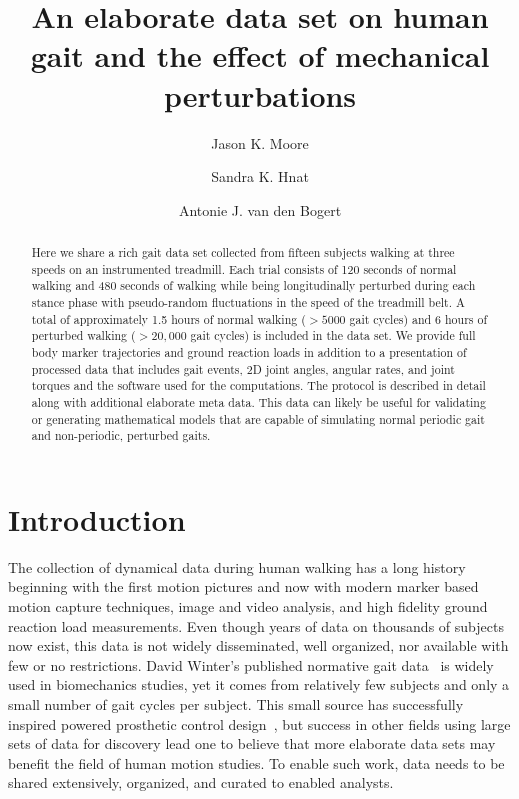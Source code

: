 \documentclass[10pt,a4paper,twocolumn]{article}
\begin{document}
\title{An elaborate data set on human gait and the effect of mechanical
  perturbations}

\author[1]{Jason K. Moore}
\author[1]{Sandra K. Hnat}
\author[1]{Antonie J. van den Bogert}


\maketitle
\thispagestyle{fancy}

\begin{abstract}

  Here we share a rich gait data set collected from fifteen subjects walking at
  three speeds on an instrumented treadmill. Each trial consists of 120 seconds
  of normal walking and 480 seconds of walking while being longitudinally
  perturbed during each stance phase with pseudo-random
  fluctuations in the speed of the treadmill belt. A total of approximately 1.5
  hours of normal walking ($>5000$ gait cycles) and 6 hours of perturbed walking
  ($>20,000$ gait cycles) is included in the data set. We provide full body
  marker trajectories and ground reaction loads in addition to a presentation of
  processed data that includes gait events, 2D joint angles, angular rates,
  and joint torques and the software used for the computations. The protocol is
  described in detail along with additional elaborate meta data. This data can
  likely be useful for validating or generating mathematical models that are
  capable of simulating normal periodic gait and non-periodic, perturbed gaits.

\end{abstract}
\clearpage

\section*{Introduction}
%
The collection of dynamical data during human walking has a long history
beginning with the first motion pictures and now with modern marker based
motion capture techniques, image and video analysis, and high fidelity ground
reaction load measurements. Even though years of data on thousands of subjects
now exist, this data is not widely disseminated, well organized, nor available
with few or no restrictions. David Winter's published normative gait
data~\cite{Winter1990} is widely used in biomechanics studies, yet it comes
from relatively few subjects and only a small number of gait cycles per
subject. This small source has successfully inspired powered prosthetic control
design~\cite{Sup2008}, but success in other fields using large sets of
data for discovery lead one to believe that more elaborate data sets may 
benefit the field of human motion studies.
To enable such work, data needs
to be shared extensively, organized, and curated to enabled analysts.
\end{document}

